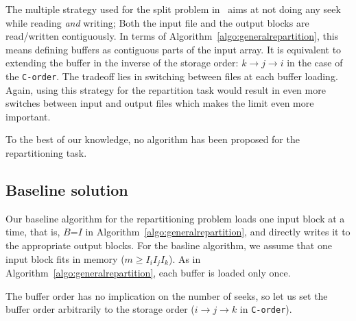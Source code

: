 \documentclass[conference]{IEEEtran}
\begin{document}
The multiple strategy used for the split problem  in~\cite{seqalgorithms}
aims at not doing any seek while reading \textit{and} writing;
Both the input file and the output blocks are read/written contiguously. In
terms of Algorithm~\ref{algo:generalrepartition}, this means defining buffers as
contiguous parts of the input array. It is equivalent to extending the buffer
in the inverse of the storage order: $k \rightarrow j \rightarrow i$ in the case
of the \texttt{C-order}. The tradeoff lies in switching between files
at each buffer loading. Again, using this strategy for the repartition task would
result in even more switches between input and output files which makes the limit
even more important.

To the best of our knowledge, no algorithm has been proposed for the
repartitioning task.

\subsection{Baseline solution}

Our baseline algorithm for the repartitioning problem loads one input block
at a time, that is, $B$=$I$ in
Algorithm~\ref{algo:generalrepartition}, and directly writes it to the appropriate output blocks.
For the basline algorithm, we assume that one input block fits in memory ($m \geq I_iI_jI_k$).
As in Algorithm~\ref{algo:generalrepartition}, each buffer is loaded only once.

The buffer order has no implication on the number of seeks, so let us set the buffer order arbitrarily
to the storage order ($i \rightarrow j \rightarrow k$ in \texttt{C-order}).
\end{document}
